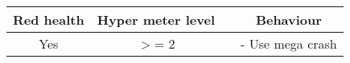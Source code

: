 \documentclass{article}
\begin{document}
\begin{landscape}

\begin{table}[h!]
  \begin{center}
    \begin{tabular*}{10cm}{c|c|c|c}
      \textbf{Red health} & \textbf{Hyper meter level} & \textbf{} & \textbf{Behaviour}\\
      \hline
      Yes & $>$= 2 & & - Use mega crash\\
      \hline
        \end{tabular*}
  \end{center}
\end{table}

\end{landscape}

\newpage
\end{document}
